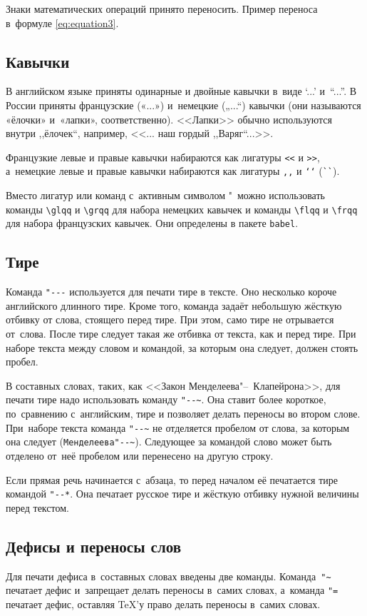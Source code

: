 Знаки математических операций принято переносить. Пример переноса
в~формуле \eqref{eq:equation3}.

\subsection{Кавычки}
В английском языке приняты одинарные и двойные кавычки в~виде ‘...’ и~“...”. В России приняты французские («...») и~немецкие („...“) кавычки (они называются «ёлочки» и~«лапки», соответственно). <<Лапки>> обычно используются внутри ,,ёлочек``, например, <<... наш гордый ,,Варяг``...>>.

Французкие левые и правые кавычки набираются
как лигатуры \verb|<<| и \verb|>>|, а~немецкие левые и правые кавычки набираются как лигатуры \verb|,,| и \verb|‘‘| (\verb|``|).

Вместо лигатур или команд с~активным символом "\ можно использовать команды \verb|\glqq| и \verb|\grqq| для набора немецких кавычек и команды \verb|\flqq| и \verb|\frqq| для набора французских кавычек. Они определены в пакете \verb|babel|.

\subsection{Тире}
Команда \verb|"---| используется для печати тире в тексте. Оно несколько короче английского длинного тире. Кроме того, команда задаёт небольшую жёсткую отбивку от слова, стоящего перед тире. При этом, само тире не отрывается от~слова. После тире следует такая же отбивка от текста, как и перед тире. При наборе текста между словом и командой, за которым она следует, должен стоять пробел.

В составных словах, таких, как <<Закон Менделеева"--~Клапейрона>>, для печати тире надо использовать команду \verb|"--~|. Она ставит более короткое, по~сравнению с~английским, тире и позволяет делать переносы во втором слове. При~наборе текста команда \verb|"--~| не отделяется пробелом от слова, за которым она следует (\verb|Менделеева"--~|). Следующее за командой слово может быть  отделено от~неё пробелом или перенесено на другую строку.

Если прямая речь начинается с~абзаца, то перед началом её печатается тире командой
\verb|"--*|. Она печатает русское тире и жёсткую отбивку нужной величины перед текстом.

\subsection{Дефисы и переносы слов}
Для печати дефиса в~составных словах введены две команды. Команда~\verb|"~| печатает дефис и~запрещает делать переносы в~самих словах, а~команда \verb|"=| печатает дефис, оставляя \TeX ’у право делать переносы в~самих словах.

